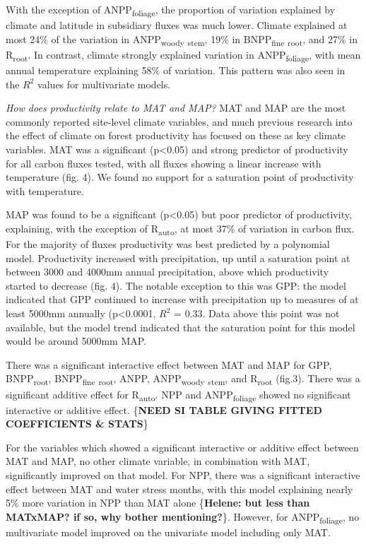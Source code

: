 \documentclass[]{article}
\begin{document}
With the exception of ANPP\textsubscript{foliage}, the proportion of
variation explained by climate and latitude in subsidiary fluxes was
much lower. Climate explained at most 24\% of the variation in
ANPP\textsubscript{woody} \textsubscript{stem}, 19\% in
BNPP\textsubscript{fine} \textsubscript{root}, and 27\% in
R\textsubscript{root}. In contrast, climate strongly explained variation
in ANPP\textsubscript{foliage}, with mean annual temperature explaining
58\% of variation. This pattern was also seen in the \(R^2\) values for
multivariate models.

\emph{How does productivity relate to MAT and MAP?} MAT and MAP are the
most commonly reported site-level climate variables, and much previous
research into the effect of climate on forest productivity has focused
on these as key climate variables. MAT was a significant
(p\textless{}0.05) and strong predictor of productivity for all carbon
fluxes tested, with all fluxes showing a linear increase with
temperature (fig. 4). We found no support for a saturation point of
productivity with temperature.

MAP was found to be a significant (p\textless{}0.05) but poor predictor
of productivity, explaining, with the exception of
R\textsubscript{auto}, at most 37\% of variation in carbon flux. For the
majority of fluxes productivity was best predicted by a polynomial
model. Productivity increased with precipitation, up until a saturation
point at between 3000 and 4000mm annual precipitation, above which
productivity started to decrease (fig. 4). The notable exception to this
was GPP: the model indicated that GPP continued to increase with
precipitation up to measures of at least 5000mm annually
(p\textless{}0.0001, \(R^2\) = 0.33. Data above this point was not
available, but the model trend indicated that the saturation point for
this model would be around 5000mm MAP.

There was a significant interactive effect between MAT and MAP for GPP,
BNPP\textsubscript{root}, BNPP\textsubscript{fine} \textsubscript{root},
ANPP, ANPP\textsubscript{woody} \textsubscript{stem}, and
R\textsubscript{root} (fig.3). There was a significant additive effect
for R\textsubscript{auto}. NPP and ANPP\textsubscript{foliage} showed no
significant interactive or additive effect. \{\textbf{NEED SI TABLE
GIVING FITTED COEFFICIENTS \& STATS}\}

For the variables which showed a significant interactive or additive
effect between MAT and MAP, no other climate variable, in combination
with MAT, significantly improved on that model. For NPP, there was a
significant interactive effect between MAT and water stress months, with
this model explaining nearly 5\% more variation in NPP than MAT alone
\{\textbf{Helene: but less than MATxMAP? if so, why bother
mentioning?}\}. However, for ANPP\textsubscript{foliage}, no
multivariate model improved on the univariate model including only MAT.
\end{document}
